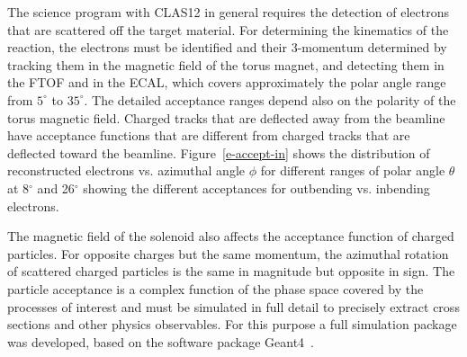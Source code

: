 \documentclass[final,3p,twocolumn]{elsarticle}
\begin{document}
The science program with CLAS12 in general requires the detection of electrons that are scattered off the target
material. For determining the kinematics of the reaction, the electrons must be identified and their 3-momentum
determined by tracking them in the magnetic field of the torus magnet, and detecting them in the FTOF and in the
ECAL, which covers approximately the polar angle range from $5^\circ$ to $35^\circ$. The detailed acceptance
ranges depend also on the polarity of the torus magnetic field. Charged tracks that are deflected away from the
beamline have acceptance functions that are different from charged tracks that are deflected toward the beamline.
Figure~\ref{e-accept-in} shows the distribution of reconstructed electrons vs. azimuthal angle $\phi$ for different
ranges of polar angle $\theta$ at 8$^\circ$ and 26$^\circ$ showing the different acceptances for outbending vs.
inbending electrons.

The magnetic field of the solenoid also affects the acceptance function of charged particles. For opposite charges but
the same momentum, the azimuthal rotation of scattered charged particles is the same in magnitude but opposite in
sign. The particle acceptance is a complex function of the phase space covered by the processes of interest and 
must be simulated in full detail to precisely extract cross sections and other physics observables.  For this purpose 
a full simulation package was developed, based on the software package Geant4~\cite{GEMC}. 
\end{document}
